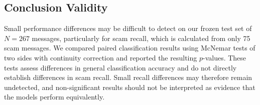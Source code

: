 \subsection{Conclusion Validity}
Small performance differences may be difficult to detect on our frozen test set of $N = 267$ messages, particularly for scam recall, which is calculated from only 75 scam messages. We compared paired classification results using McNemar tests of two sides with continuity correction and reported the resulting $p$-values. These tests assess differences in general classification accuracy and do not directly establish differences in scam recall. Small recall differences may therefore remain undetected, and non-significant results should not be interpreted as evidence that the models perform equivalently.
